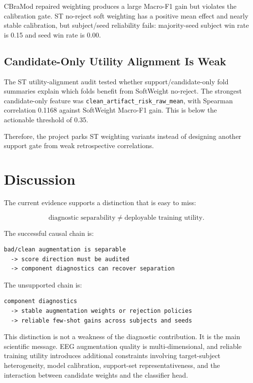 \documentclass[11pt]{article}
\begin{document}
CBraMod repaired weighting produces a large Macro-F1 gain but violates the calibration gate. ST no-reject soft weighting has a positive mean effect and nearly stable calibration, but subject/seed reliability fails: majority-seed subject win rate is 0.15 and seed win rate is 0.00.

\subsection{Candidate-Only Utility Alignment Is Weak}

The ST utility-alignment audit tested whether support/candidate-only fold summaries explain which folds benefit from SoftWeight no-reject. The strongest candidate-only feature was \texttt{clean\_artifact\_risk\_raw\_mean}, with Spearman correlation 0.1168 against SoftWeight Macro-F1 gain. This is below the actionable threshold of 0.35.

Therefore, the project parks ST weighting variants instead of designing another support gate from weak retrospective correlations.

\section{Discussion}

The current evidence supports a distinction that is easy to miss:

\[
\text{diagnostic separability} \ne \text{deployable training utility}.
\]

The successful causal chain is:

\begin{verbatim}
bad/clean augmentation is separable
  -> score direction must be audited
  -> component diagnostics can recover separation
\end{verbatim}

The unsupported chain is:

\begin{verbatim}
component diagnostics
  -> stable augmentation weights or rejection policies
  -> reliable few-shot gains across subjects and seeds
\end{verbatim}

This distinction is not a weakness of the diagnostic contribution. It is the main scientific message. EEG augmentation quality is multi-dimensional, and reliable training utility introduces additional constraints involving target-subject heterogeneity, model calibration, support-set representativeness, and the interaction between candidate weights and the classifier head.
\end{document}
